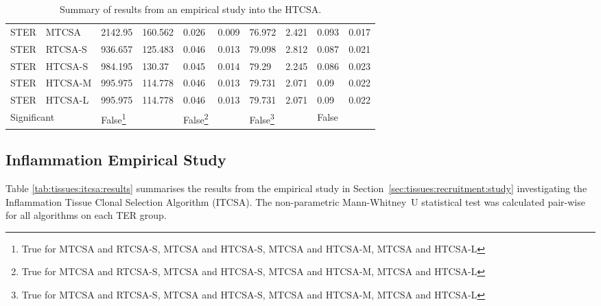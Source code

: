 \begin{table}[H]
\begin{minipage}{\textwidth}
\begin{tabular}{llllllllll}
			\midrule
			STER & MTCSA & 2142.95 & 160.562 & 0.026 & 0.009 & 76.972 & 2.421 & 0.093 & 0.017 \\ 
			STER & RTCSA-S & 936.657 & 125.483 & 0.046 & 0.013 & 79.098 & 2.812 & 0.087 & 0.021 \\ 
			STER & HTCSA-S & 984.195 & 130.37 & 0.045 & 0.014 & 79.29 & 2.245 & 0.086 & 0.023 \\ 
			STER & HTCSA-M & 995.975 & 114.778 & 0.046 & 0.013 & 79.731 & 2.071 & 0.09 & 0.022 \\ 
			STER & HTCSA-L & 995.975 & 114.778 & 0.046 & 0.013 & 79.731 & 2.071 & 0.09 & 0.022 \\ 
			\multicolumn{2}{l}{Significant} & False\footnote{True for MTCSA and RTCSA-S, MTCSA and HTCSA-S, MTCSA and HTCSA-M, MTCSA and HTCSA-L} &  & False\footnote{True for MTCSA and RTCSA-S, MTCSA and HTCSA-S, MTCSA and HTCSA-M, MTCSA and HTCSA-L} &  & False\footnote{True for MTCSA and RTCSA-S, MTCSA and HTCSA-S, MTCSA and HTCSA-M, MTCSA and HTCSA-L} &  & False &  \\ 
			\bottomrule
			\end{tabular}			
		\end{minipage}
	\caption{Summary of results from an empirical study into the HTCSA.}
	\label{tab:tissues:htcsa:results}
\end{table}


%
%
\subsection{Inflammation Empirical Study}
\label{appendix:results:tissues:inflammation}
Table \ref{tab:tissues:itcsa:results} summarises the results from the empirical study in Section~\ref{sec:tissues:recruitment:study} investigating the Inflammation Tissue Clonal Selection Algorithm (ITCSA). The non-parametric Mann-Whitney~U statistical test was calculated pair-wise for all algorithms on each TER group. 

